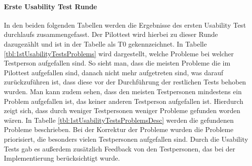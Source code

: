 \paragraph{Erste Usability Test Runde}

In den beiden folgenden Tabellen werden die Ergebnisse des ersten Usability Test durchlaufs zusammengefasst. Der Pilottest wird hierbei zu dieser Runde dazugezählt und ist in der Tabelle als T0 gekennzeichnet. In Tabelle \ref{tbl:1stUsabilityTestsProblems} wird dargestellt, welche Probleme bei welcher Testperson aufgefallen sind. So sieht man, dass die meisten Probleme die im Pilottest aufgefallen sind, danach nicht mehr aufgetreten sind, was darauf zurückzuführen ist, dass diese vor der Durchführung der restlichen Tests behoben wurden. Man kann zudem sehen, dass den meisten Testpersonen mindestens ein Problem aufgefallen ist, das keiner anderen Testperson aufgefallen ist. Hierdurch zeigt sich, dass durch weniger Testpersonen weniger Probleme gefunden worden wären. In Tabelle \ref{tbl:1stUsabilityTestsProblemsDesc} werden die gefundenen Probleme beschrieben. Bei der Korrektur der Probleme wurden die Probleme priorisiert, die besonders vielen Testpersonen aufgefallen sind. Durch die Usability Tests gab es außerdem zusätzlich Feedback von den Testpersonen, das bei der Implementierung berücksichtigt wurde.

